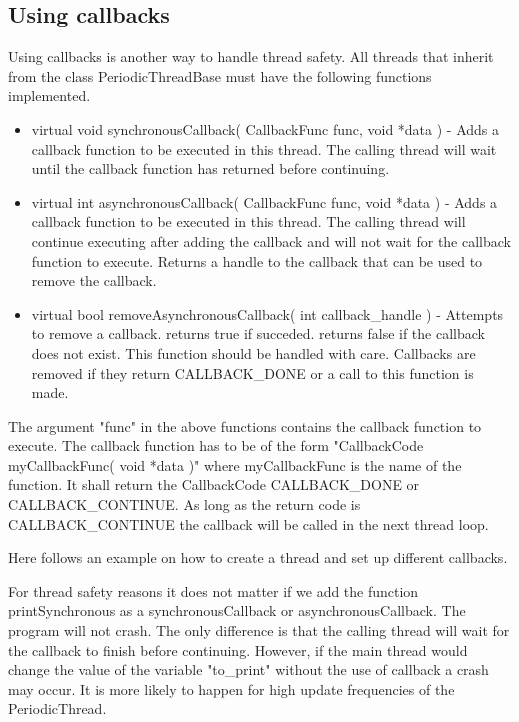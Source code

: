 

\subsection{Using callbacks}
Using callbacks is another way to handle thread safety. All threads that
inherit from the class PeriodicThreadBase must have the following functions
implemented.

\begin{itemize}
\item virtual void synchronousCallback( CallbackFunc func, void *data ) - Adds
  a callback function to be executed in this thread. The calling thread will
  wait until the callback function has returned before continuing.
\item virtual int asynchronousCallback( CallbackFunc func, void *data ) - Adds
  a callback function to be executed in this thread. The calling thread will
  continue executing after adding the callback and will not wait for the
  callback function to execute. Returns a handle to the callback that can be
  used to remove the callback.
\item virtual bool removeAsynchronousCallback( int callback\_handle ) - 
  Attempts to remove a callback. returns true if succeded. returns false if
  the callback does not exist. This function should be handled with care.
  Callbacks are removed if they return CALLBACK\_DONE or a call to this
  function is made.
\end{itemize}

The argument "func" in the above functions contains the callback function to
execute. The callback function has to be of the form
"CallbackCode myCallbackFunc( void *data )" where myCallbackFunc is the name of
the function. It shall return the CallbackCode CALLBACK\_DONE or
CALLBACK\_CONTINUE. As long as the return code is CALLBACK\_CONTINUE the
callback will be called in the next thread loop.

Here follows an example on how to create a thread and set up different
callbacks.



For thread safety reasons it does not matter if we add the function
printSynchronous as a synchronousCallback or asynchronousCallback. The program
will not crash. The only difference is that the calling thread will wait for
the callback to finish before continuing. However, if the main thread would
change the value of the variable "to\_print" without the use of callback a
crash may occur. It is more likely to happen for high update frequencies of the
PeriodicThread.


